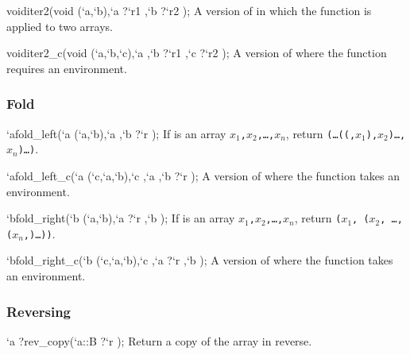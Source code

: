 \begin{defun2}{void}{iter2}{(void (`a,`b),`a {?}`r1 ,`b {?}`r2 );}
  A version of  in which the function is applied to two arrays.
\end{defun2}


\begin{defun2}{void}{iter2_c}{(void (`a,`b,`c),`a ,`b {?}`r1 ,`c {?}`r2 );}
  A version of  where the function requires an environment.
\end{defun2}


\subsubsection*{Fold}

\begin{defun2}{`a}{fold_left}{(`a (`a,`b),`a ,`b {?}`r );}
  If  is an array \texttt{\lb$x_1$,$x_2$,\ldots,$x_n$\rb},
  return \texttt{(\ldots{}((,$x_1$),$x_2$)\ldots, $x_n$)\ldots)}.
\end{defun2}

\begin{defun2}{`a}{fold_left_c}{(`a (`c,`a,`b),`c ,`a ,`b {?}`r );}
  A version of  where the function  takes an
  environment.
\end{defun2}

\begin{defun2}{`b}{fold_right}{(`b (`a,`b),`a {?}`r ,`b );}
  If  is an array \texttt{\lb$x_1$,$x_2$,\ldots,$x_n$\rb},
  return \texttt{($x_1$, ($x_2$, \ldots, ($x_n$,)\ldots))}.
\end{defun2}
\begin{defun2}{`b}{fold_right_c}{(`b (`c,`a,`b),`c ,`a {?}`r ,`b );}
  A version of  where the function  takes an
  environment.
\end{defun2}

\subsubsection*{Reversing}

\begin{defun2}{`a ?}{rev_copy}{(`a::B {?}`r );}
  Return a copy of the array  in reverse.
\end{defun2}

